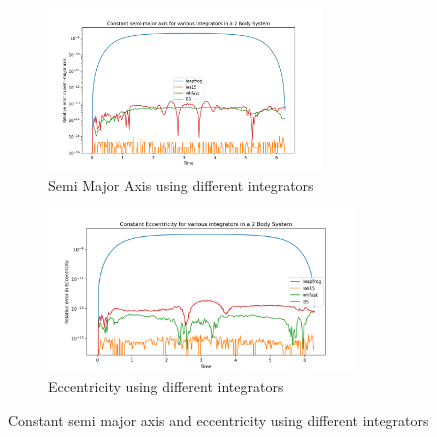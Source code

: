 \documentclass[12pt,a4paper]{article}
\begin{document}
\begin{figure}[H]
  \centering
  \begin{subfigure}{0.49\textwidth}
    \includegraphics[height = 1.7in]{2Body/2Body_const_a_int.png}
    \caption{Semi Major Axis using different integrators}
    \label{fig:int_a}  
  \end{subfigure}
  \begin{subfigure}{0.49\textwidth}
    \includegraphics[height = 1.7in]{2Body/2Body_const_ecc_int.png}
    \caption{Eccentricity using different integrators} 
    \label{fig:int_ecc}  
  \end{subfigure}
  \caption{Constant semi major axis and eccentricity using different integrators}
\end{figure}
\end{document}
